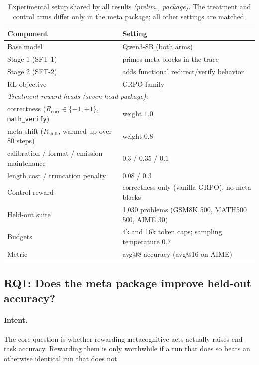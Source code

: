\begin{table}[t]
\caption{Experimental setup shared by all results \emph{(prelim., package)}.
The treatment and control arms differ only in the meta package; all other
settings are matched.}
\label{tab:setup}
\begin{center}
\small
\begin{tabular}{ll}
\toprule
Component & Setting \\
\midrule
Base model        & Qwen3-8B (both arms) \\
Stage 1 (SFT-1)   & primes meta blocks in the trace \\
Stage 2 (SFT-2)   & adds functional redirect/verify behavior \\
RL objective      & GRPO-family~\citep{shao2024deepseekmath} \\
\midrule
\multicolumn{2}{l}{\emph{Treatment reward heads (seven-head package):}} \\
\quad correctness ($R_{\mathrm{corr}}\!\in\!\{-1,+1\}$, \texttt{math\_verify}) & weight $1.0$ \\
\quad meta-shift ($R_{\mathrm{shift}}$, warmed up over 80 steps) & weight $0.8$ \\
\quad calibration / format / emission maintenance & $0.3$ / $0.35$ / $0.1$ \\
\quad length cost / truncation penalty & $0.08$ / $0.3$ \\
Control reward    & correctness only (vanilla GRPO), no meta blocks \\
\midrule
Held-out suite    & 1{,}030 problems (GSM8K 500, MATH500 500, AIME 30) \\
Budgets           & 4k and 16k token caps; sampling temperature $0.7$ \\
Metric            & avg@8 accuracy (avg@16 on AIME) \\
\bottomrule
\end{tabular}
\end{center}
\end{table}

\subsection{RQ1: Does the meta package improve held-out accuracy?}
\label{sec:exp:rq1}

\paragraph{Intent.} The core question is whether rewarding metacognitive acts
actually raises end-task accuracy. Rewarding them is only worthwhile if a run
that does so beats an otherwise identical run that does not.

